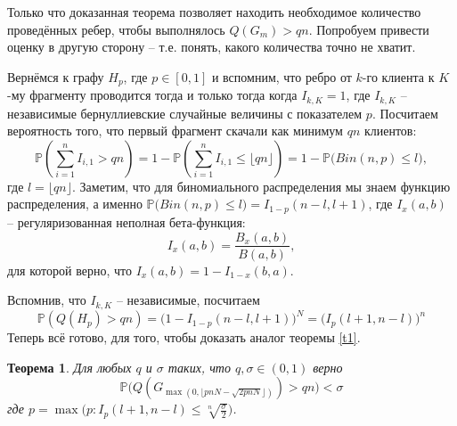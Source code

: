 \documentclass[10pt]{article}
\newcommand{\PRob}{\mathbb P}
\newcommand{\leqs}{\leqslant}
\newtheorem{theorem}{Теорема}
\theoremstyle{named}
\begin{document}
\bigskip

Только что доказанная теорема позволяет находить необходимое количество проведённых ребер, чтобы выполнялось $Q(G_m) > qn$.
Попробуем привести оценку в другую сторону -- т.е. понять, какого количества точно не хватит.

Вернёмся к графу $H_p$, где $p \in [0,1]$ и вспомним, что ребро от $k$-го клиента к $K$-му фрагменту проводится тогда и только тогда
когда $I_{k,K} = 1$, где $I_{k,K}$ -- независимые бернуллиевские случайные величины с показателем $p$. 
Посчитаем вероятность того, что первый фрагмент скачали как минимум $qn$ клиентов:
\begin{equation}
\PRob\left(\sum_{i=1}^n I_{i,1} > qn\right) 
	= 
1 - \PRob\left(\sum_{i=1}^n I_{i,1} \leqs \lfloor qn \rfloor\right) 
	= 
1 - \PRob\big(Bin(n, p) \leqs l\big),
\end{equation}
где $l = \lfloor qn \rfloor$. Заметим, что для биномиального распределения мы знаем функцию распределения, 
а именно $\PRob\big(Bin(n, p) \leqs l\big) = I_{1-p}(n-l, l+1)$, где $I_x(a,b)$ -- регуляризованная неполная бета-функция:
\begin{equation}
I_x(a,b) = \frac{B_x(a,b)}{B(a,b)},
\end{equation}
для которой верно, что $I_x(a,b) = 1 - I_{1-x}(b, a)$.

Вспомнив, что $I_{k,K}$ -- независимые, посчитаем
\begin{equation}\label{n21}
\PRob(Q(H_p) > qn) = \big(1 - I_{1-p}(n-l, l+1)\big)^N = \big(I_{p}(l+1, n-l)\big)^n
\end{equation}
Теперь всё готово, для того, чтобы доказать аналог теоремы \ref{t1}.

\begin{theorem}\label{t2}
Для любых $q$ и $\sigma$ таких, что $q, \sigma \in (0,1)$ верно
\begin{equation}
\PRob\big(Q(G_{\max(0, \lfloor pnN - \sqrt{2pnN} \rfloor)}) > qn\big) < \sigma
\end{equation}
где $p = \max\big(p :  I_p(l+1, n-l) \leqs \sqrt[n]{\frac\sigma{2}} \big)$.
\end{theorem}
\end{document}
